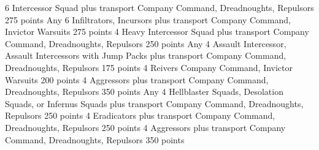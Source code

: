 \documentclass[a4paper, twocolumn]{article}
\begin{document}

          {6 Intercessor Squad plus transport}
          {Company Command, Dreadnoughts, Repulsors}
          {275 points}
          {Any 6 Infiltrators, Incursors plus transport}
          {Company Command, Invictor Warsuits}
          {275 points}
          {4 Heavy Intercessor Squad plus transport}
          {Company Command, Dreadnoughts, Repulsors}
          {250 points}
          {Any 4 Assault Intercessor, Assault Intercessors with Jump Packs plus transport}
          {Company Command, Dreadnoughts, Repulsors}
          {175 points}  
          {4 Reivers}
          {Company Command, Invictor Warsuits}
          {200 points}
          {4 Aggressors plus transport}
          {Company Command, Dreadnoughts, Repulsors}
          {350 points}
          {Any 4 Hellblaster Squads, Desolation Squads, or Infernus Squads plus transport}
          {Company Command, Dreadnoughts, Repulsors}
          {250 points}
          {4 Eradicators plus transport}
          {Company Command, Dreadnoughts, Repulsors}
          {250 points}
          {4 Aggressors plus transport}
          {Company Command, Dreadnoughts, Repulsors}
          {350 points}
\formationsEND
\end{document}
